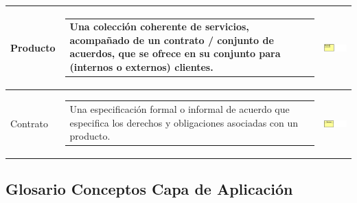 \begin{longtable}[c]{|p{2.5cm}|l|c|}
	Producto				    & \begin{tabular}[c]{p{7cm}@{}l@{}}Una colección coherente de servicios, acompañado de un contrato / conjunto de acuerdos, que se ofrece en su conjunto para (internos o externos) clientes.\end{tabular} & \includegraphics[width=35mm]{arquitectura/adm_lenguaje/imgs/business/Product}          \\ \hline
	Contrato				    & \begin{tabular}[c]{p{7cm}@{}l@{}}Una especificación formal o informal de acuerdo que especifica los derechos y obligaciones asociadas con un producto.\end{tabular} & \includegraphics[width=35mm]{arquitectura/adm_lenguaje/imgs/business/Contract}          \\ \hline
\end{longtable}


\newpage

\subsection{Glosario Conceptos Capa de Aplicación}

